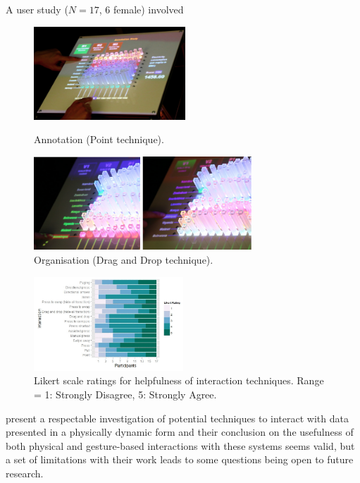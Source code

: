 \documentclass[11pt]{article}
\begin{document}
A user study ($N=17$, 6 female) involved 

\begin{figure}[H]
\centering
  \includegraphics[height=3.5cm]{img/taher2015-annotation.png}
  \caption{Annotation (Point technique).}\label{fig:taher2015-annotation}
\endminipage\hfill
{}%
\centering
  \includegraphics[height=3.5cm]{img/taher2015-organize.png}
  \caption{Organisation (Drag and Drop technique).}\label{fig:taher2015-organize}
\endminipage
\end{figure}

\begin{figure}[H]
\centering
\includegraphics[width=0.5\textwidth]{img/taher2015-likert.png} 
\caption{Likert scale ratings for helpfulness of interaction
techniques. Range = 1: Strongly Disagree, 5: Strongly Agree.}\label{fig:taher2015-likert}
\end{figure}

\citet{taher2015} present a respectable investigation of potential techniques to interact with data presented in a physically dynamic form and their conclusion on the usefulness of both physical and gesture-based interactions with these systems seems valid, but a set of limitations with their work leads to some questions being open to future research. 
\end{document}
